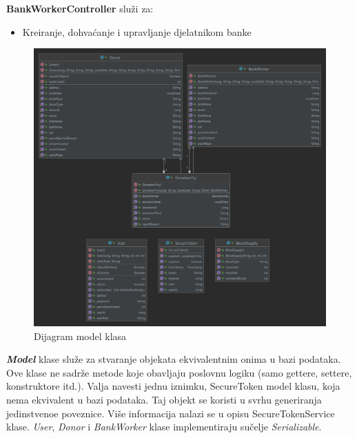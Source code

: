     \textbf{BankWorkerController} služi za: 
    \begin{itemize}
        \item Kreiranje, dohvaćanje i upravljanje djelatnikom banke
    \end{itemize}
    
    \begin{figure}[H]
        \includegraphics[scale=0.20]{slike/Model.png}
		\centering
		\caption{Dijagram model klasa}
		\label{fig:model}
    \end{figure}
    
    \textbf{\textit{Model}} klase služe za stvaranje objekata ekvivalentnim onima u bazi podataka. Ove klase ne sadrže metode koje obavljaju poslovnu logiku (samo gettere, settere, konstruktore itd.).  Valja navesti jednu iznimku, SecureToken model klasu, koja nema ekvivalent u bazi podataka. Taj objekt se koristi u svrhu generiranja jedinstvenoe poveznice. Više informacija nalazi se u opisu SecureTokenService klase. \textit{User}, \textit{Donor} i \textit{BankWorker} klase implementiraju sučelje \textit{Serializable}.
    
